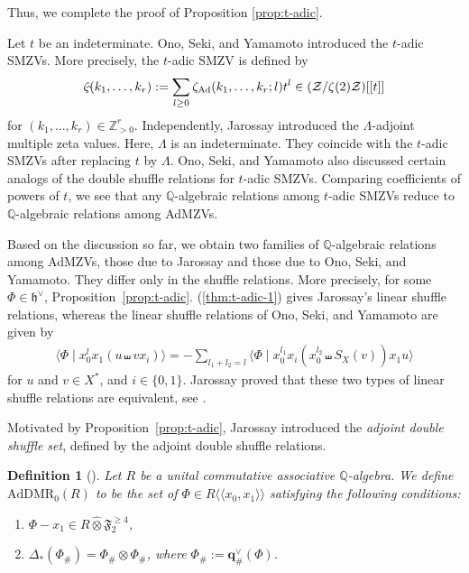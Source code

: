 \documentclass[15pt,oneside,reqno]{amsart}
\newcounter{dfcounter}
\newtheorem{df}{Definition}[dfcounter]
\theoremstyle{remark}{
\newtheorem{lem}[df]{Lemma}
\newtheorem{prop}[df]{Proposition}
\newtheorem{ex}[df]{Example}
\newtheorem{rmk}[df]{Remark}
}
\newcommand{\ide}[1]{\mathfrak{#1}}
\newcommand{\Q}{\mathbb{Q}}
\newcommand{\AdDMR}{\mathrm{AdDMR}}
\newcommand{\cotimes}{\widehat{\otimes}}
\let\S\relax
\newcommand{\S}{\mathcal{S}}
\newcommand{\Admzv}[2]{\zeta_{\mathrm{Ad}}(#2;#1)}
\begin{document}
Thus, we complete the proof of Proposition \ref{prop:t-adic}.



\begin{rmk}
Let $t$ be an indeterminate.
Ono, Seki, and Yamamoto \cite{Ono-Seki-Yamamoto} introduced the $t$-adic SMZVs.
More precisely, the $t$-adic SMZV is defined by
\[
\zeta_{\widehat{\S}}(k_1,\ldots,k_r)
:= \sum_{l\ge 0} \Admzv{l}{k_1,\ldots,k_r} t^l
\in (\mathcal{Z}/\zeta(2)\mathcal{Z})[[t]]
\]
for $(k_1,\ldots,k_r) \in \mathbb{Z}_{>0}^r$.
Independently, Jarossay \cite[Definition~2.3.1(ii)]{Jarossay} introduced the $\Lambda$-adjoint multiple zeta values. Here, $\Lambda$ is an indeterminate.
They coincide with the $t$-adic SMZVs after replacing $t$ by $\Lambda$.
Ono, Seki, and Yamamoto also discussed certain analogs of the double shuffle relations for $t$-adic SMZVs.
Comparing coefficients of powers of $t$, we see that any $\Q$-algebraic relations among $t$-adic SMZVs reduce to $\Q$-algebraic relations among AdMZVs.

Based on the discussion so far, we obtain two families of $\Q$-algebraic relations among AdMZVs, those due to Jarossay and those due to Ono, Seki, and Yamamoto.
They differ only in the shuffle relations.
More precisely, for some $\Phi \in \ide{h}^{\vee}$, Proposition~\ref{prop:t-adic}. (\ref{thm:t-adic-1}) gives Jarossay's linear shuffle relations, whereas the linear shuffle relations of Ono, Seki, and Yamamoto are given by
\begin{align*}
\langle \Phi \mid x_0^l x_1(u\shuffle v x_i)\rangle
= -\sum_{l_1+l_2 = l} \langle \Phi \mid x_0^{l_1}x_i(x_0^{l_2}\shuffle S_X(v))x_1u\rangle
\end{align*}
for $u$ and $v\in X^*$, and $i\in\{0,1\}$.
Jarossay proved that these two types of linear shuffle relations are equivalent, see \cite[Proposition 3.4.1]{Jarossay}.
\end{rmk}




Motivated by Proposition~\ref{prop:t-adic}, Jarossay introduced the \emph{adjoint double shuffle set}, defined by the adjoint double shuffle relations.
\begin{df}[{\cite[Definition 3.2.6]{Jarossay}}]\label{def:AdDMR}
Let $R$ be a unital commutative associative $\Q$-algebra.
We define $\AdDMR_0(R)$ to be the set of $\Phi \in R\langle\!\langle x_0,x_1 \rangle\!\rangle$ satisfying the following conditions:
\begin{enumerate}
\item\label{def:AdDMR-2} $\Phi - x_1 \in R\cotimes \ide{F}_2^{\ge 4}$,
\item\label{def:AdDMR-3} $\Delta_{*}(\Phi_{\#}) = \Phi_{\#} \otimes \Phi_{\#}$, where $\Phi_{\#} := \mathbf{q}_{\#}^{\vee}(\Phi)$.
\end{enumerate}
\end{df}
\end{document}
